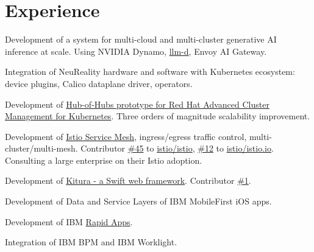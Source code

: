 \documentclass[]{deedy-resume}
\begin{document}
\hfill
\begin{minipage}[t]{0.66\textwidth}


\section{Experience}

\vspace{\topsep} %
\begin{tightemize}
\item Development of a system for multi-cloud and multi-cluster generative AI inference at scale. Using NVIDIA Dynamo,
  \href{https://www.linkedin.com/posts/vadimeisenberg_llmd-kubernetes-llminference-activity-7411405769872506880-RZqy}{llm-d},
  Envoy AI Gateway.
\item Integration of NeuReality hardware and software with Kubernetes ecosystem: device plugins, Calico dataplane driver, operators.
\end{tightemize}
\sectionsep


\vspace{\topsep} %
\begin{tightemize}
\item Development of \href{https://github.com/stolostron/hub-of-hubs}{Hub-of-Hubs prototype for Red Hat Advanced Cluster Management for Kubernetes}. Three orders of magnitude scalability improvement.
\item Development of \href{https://istio.io}{Istio Service Mesh}, ingress/egress traffic control, multi-cluster/multi-mesh.
Contributor \href{https://github.com/istio/istio/graphs/contributors}{\#45} to \href{https://github.com/istio/istio}{istio/istio}, \href{https://github.com/istio/istio.io/graphs/contributors}{\#12} to \href{https://github.com/istio/istio.io}{istio/istio.io}. Consulting a large enterprise on their Istio adoption.
\item Development of \href{https://github.com/Kitura/Kitura}{Kitura - a Swift web framework}. Contributor \href{https://github.com/Kitura/Kitura/graphs/contributors}{\#1}.
\item Development of Data and Service Layers of IBM MobileFirst iOS apps.
\item Development of IBM \href{https://heidloff.net/article/ibm-announces-citizen-developer-tool-to-build-situational-apps-bluemix-rapidapps/}{Rapid Apps}.
\item Integration of IBM BPM and IBM Worklight.
\end{tightemize}
\sectionsep


\end{minipage}
\end{document}
